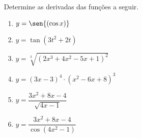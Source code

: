 \begin{frame}
  \begin{columns}[onlytextwidth]
    \begin{column}{0.48\textwidth}\vspace{-0.5cm}
      \begin{example}
        Determine as derivadas das funções a seguir.
      \end{example}
      \begin{enumerate}
        \item $y = \sen{(\cos{x})}$
        \item $y = \tan{(3t^{2} + 2t)}$
        \item $y =\sqrt[3]{(2x^3 + 4x^2 - 5x + 1)^2}$
        \item $y = (3x-3)^4 \cdot (x^2-6x+8)^3$
        \item $y = \dfrac{3x^2+8x-4}{\sqrt{4x-1}}$
        \item $y = \dfrac{3x^2+8x-4}{\cos{(4x^{2}-1)}}$
      \end{enumerate}
    \end{column}
    \begin{column}{0.5\textwidth}\vspace{-0.3cm}
    \end{column}
  \end{columns}
\end{frame}
